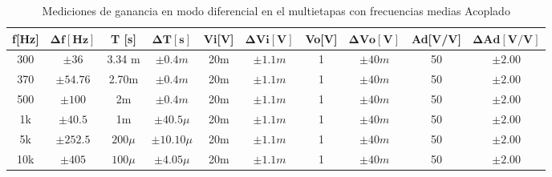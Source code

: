 \begin{enumerate}
        \begin{table}[H]
          \centering
          \begin{tabular}{|c|c|c|c|c|c|c|c|c|c|}
            \hline
            \textbf{f[Hz]} & $\mathbf{\Delta f [Hz]}$ & \textbf{T [s]} & $\mathbf{\Delta T [s]}$ & \textbf{Vi[V]} & $\mathbf{\Delta Vi[V]}$ & \textbf{Vo[V]} & $\mathbf{\Delta Vo[V]}$ & \textbf{Ad[V/V]} & $\mathbf{\Delta Ad[V/V]}$ \\
            \hline
            300            & $\pm 36$                 & 3.34 m         & $\pm 0.4m$              & 20m            & $\pm 1.1m$              & 1              & $\pm 40m$               & 50               & $\pm 2.00$                \\
            \hline
            370            & $\pm 54.76$              & 2.70m          & $\pm 0.4m$              & 20m            & $\pm 1.1m$              & 1              & $\pm 40m$               & 50               & $\pm 2.00$                \\
            \hline
            500            & $\pm 100$                & 2m             & $\pm 0.4m$              & 20m            & $\pm 1.1m$              & 1              & $\pm 40m$               & 50               & $\pm 2.00$                \\
            \hline
            1k             & $\pm 40.5$               & 1m             & $\pm 40.5 \mu$          & 20m            & $\pm 1.1m$              & 1              & $\pm 40m$               & 50               & $\pm 2.00$                \\
            \hline
            5k             & $\pm 252.5$              & $200 \mu$      & $\pm 10.10 \mu$         & 20m            & $\pm 1.1m$              & 1              & $\pm 40m$               & 50               & $\pm 2.00$                \\
            \hline
            10k            & $\pm 405$                & $100 \mu$      & $\pm 4.05 \mu$          & 20m            & $\pm 1.1m$              & 1              & $\pm 40m$               & 50               & $\pm 2.00$                \\
            \hline
          \end{tabular}
          \caption{Mediciones de ganancia en modo diferencial en el multietapas con frecuencias medias Acoplado}
          \label{tab:ganancia_frecuencias_medias}
        \end{table}



\end{enumerate}
